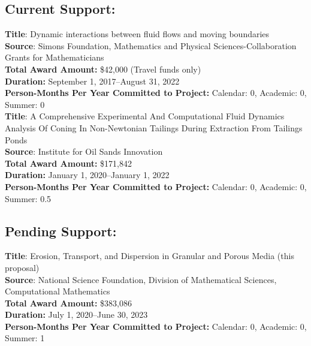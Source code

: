 \documentclass[11pt]{article}
\begin{document}
\subsection*{Current Support:}

{\bf Title}: Dynamic interactions between fluid flows and moving boundaries \\
{\bf Source}: Simons Foundation, Mathematics and Physical
Sciences-Collaboration Grants for Mathematicians \\
{\bf Total Award Amount:} \$42,000 (Travel funds only) \\
{\bf Duration:} September 1, 2017--August 31, 2022 \\
{\bf Person-Months Per Year Committed to Project:} Calendar: 0,
Academic: 0, Summer: 0 \\

\noindent
{\bf Title}:  A Comprehensive Experimental And Computational Fluid Dynamics Analysis Of Coning In Non-Newtonian Tailings During Extraction From Tailings Ponds \\
{\bf Source}:  Institute for Oil Sands Innovation\\
{\bf Total Award Amount:} \$171,842 \\
{\bf Duration:}  January 1, 2020--January 1, 2022\\
{\bf Person-Months Per Year Committed to Project:} Calendar: 0,
Academic: 0, Summer: 0.5 \\

\subsection*{Pending Support:}
{\bf Title}: Erosion, Transport, and Dispersion in Granular and Porous
Media (this proposal) \\
{\bf Source}: National Science Foundation, Division of Mathematical
Sciences, Computational Mathematics \\
{\bf Total Award Amount:} \$383,086 \\
{\bf Duration:} July 1, 2020--June 30, 2023 \\
{\bf Person-Months Per Year Committed to Project:} Calendar: 0,
Academic: 0, Summer: 1 \\
\end{document}
